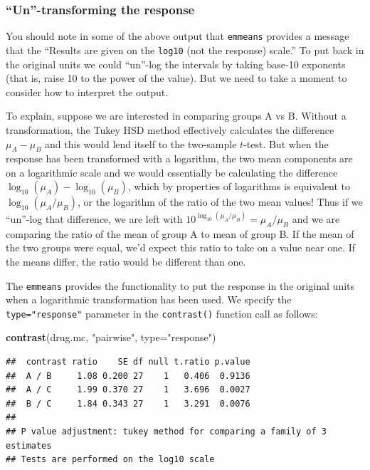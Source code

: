 \documentclass[
]{book}
\newenvironment{Shaded}{\begin{snugshade}}{\end{snugshade}}
\newcommand{\AttributeTok}[1]{\textcolor[rgb]{0.13,0.29,0.53}{#1}}
\newcommand{\FunctionTok}[1]{\textcolor[rgb]{0.13,0.29,0.53}{\textbf{#1}}}
\newcommand{\NormalTok}[1]{#1}
\newcommand{\StringTok}[1]{\textcolor[rgb]{0.31,0.60,0.02}{#1}}
\begin{document}
\hypertarget{un-transforming-the-response}{%
\subsubsection{``Un''-transforming the response}\label{un-transforming-the-response}}

You should note in some of the above output that \texttt{emmeans} provides a message that the ``Results are given on the \texttt{log10} (not the response) scale.'' To put back in the original units we could ``un''-log the intervals by taking base-10 exponents (that is, raise 10 to the power of the value). But we need to take a moment to consider how to interpret the output.

To explain, suppose we are interested in comparing groups A vs B.
Without a transformation, the Tukey HSD method effectively calculates the difference \(\mu_A - \mu_B\) and this would lend itself to the two-sample \(t\)-test.
But when the response has been transformed with a logarithm, the two mean components are on a logarithmic scale and we would essentially be calculating the difference \(\log_{10}(\mu_A) - \log_{10}(\mu_B)\), which by properties of logarithms is equivalent to \(\log_{10}(\mu_A/\mu_B)\), or the logarithm of the ratio of the two mean values!
Thus if we ``un''-log that difference, we are left with \(10^{\log_{10}(\mu_A/\mu_B)} = \mu_A/\mu_B\) and we are comparing the ratio of the mean of group A to mean of group B.
If the mean of the two groups were equal, we'd expect this ratio to take on a value near one.
If the means differ, the ratio would be different than one.

The \texttt{emmeans} provides the functionality to put the response in the original units when a logarithmic transformation has been used. We specify the \texttt{type="response"} parameter in the \texttt{contrast()} function call as follows:

\begin{Shaded}
\begin{Highlighting}[]
\FunctionTok{contrast}\NormalTok{(drug.mc, }\StringTok{"pairwise"}\NormalTok{, }\AttributeTok{type=}\StringTok{"response"}\NormalTok{)}
\end{Highlighting}
\end{Shaded}

\begin{verbatim}
##  contrast ratio    SE df null t.ratio p.value
##  A / B     1.08 0.200 27    1   0.406  0.9136
##  A / C     1.99 0.370 27    1   3.696  0.0027
##  B / C     1.84 0.343 27    1   3.291  0.0076
## 
## P value adjustment: tukey method for comparing a family of 3 estimates 
## Tests are performed on the log10 scale
\end{verbatim}
\end{document}
